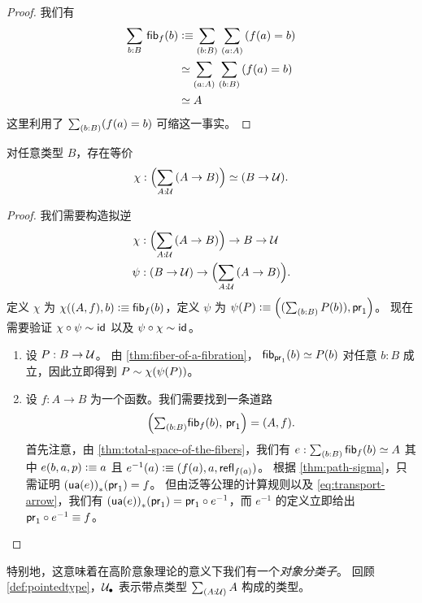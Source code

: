 \begin{proof}
  我们有
  \begin{align*}
    \sm{b:B}\hfib{f}{b} &\defeq \sm{b:B}{a:A} (f(a)=b)\\
    &\eqvsym \sm{a:A}{b:B} (f(a)=b)\\
    &\eqvsym A
  \end{align*}
  这里利用了 $\sm{b:B} (f(a)=b)$ 可缩这一事实。
\end{proof}

\begin{thm}\label{thm:nobject-classifier-appetizer}
对任意类型 $B$，存在等价
\begin{equation*}
\chi:\Parens{\sm{A:\type} (A\to B)}\eqvsym (B\to\type).
\end{equation*}
\end{thm}

\begin{proof}
我们需要构造拟逆
\begin{align*}
\chi & : \Parens{\sm{A:\type} (A\to B)}\to B\to\type\\
\psi & : (B\to\type)\to\Parens{\sm{A:\type} (A\to B)}.
\end{align*}
定义 $\chi$ 为 $\chi((A,f),b)\vcentcolon\equiv{\mathsf{fib}}_{f}(b)$，定义 $\psi$ 为 $\psi(P)\defeq\Pairr{(\sm{b:B} P(b)),\proj1}$。
现在需要验证 $\chi\circ\psi\sim\mathsf{id}_{}{}$ 以及 $\psi\circ\chi \sim\mathsf{id}_{}{}$。
\begin{enumerate}
\item 设 $P:B\to\mathcal{U}$。
  由 \cref{thm:fiber-of-a-fibration}，
${\mathsf{fib}}_{\mathsf{pr}_{1}}(b)\simeq P(b)$ 对任意 $b:B$ 成立，因此立即得到 $P\sim\chi(\psi(P))$。
\item 设 $f:A\to B$ 为一个函数。我们需要找到一条道路
\begin{equation*}
\Pairr{\tsm{b:B} \hfiber{f}b,\,\proj1}=\pairr{A,f}.
\end{equation*}
首先注意，由 \cref{thm:total-space-of-the-fibers}，我们有
$e:\sm{b:B} \hfiber{f}b\eqvsym A$ 其中 $e(b,a,p)\vcentcolon\equiv a$ 且 $e^{-1}(a)
\vcentcolon\equiv(f(a),a,\mathsf{refl}_{f(a)})$。
根据 \cref{thm:path-sigma}，只需证明 ${(\mathsf{ua}(e))}_{*}\mathopen{}\left({\mathsf{pr}_{1}}\right)\mathclose{} = f$。
但由泛等公理的计算规则以及 \eqref{eq:transport-arrow}，我们有 ${(\mathsf{ua}(e))}_{*}\mathopen{}\left({\mathsf{pr}_{1}}\right)\mathclose{} = \mathsf{pr}_{1}\circ e^{-1}$，而 $e^{-1}$ 的定义立即给出 $\mathsf{pr}_{1} \circ e^{-1} \equiv f$。\qedhere
\end{enumerate}
\end{proof}

\noindent
{}%
%
%
特别地，这意味着在高阶意象理论的意义下我们有一个\emph{对象分类子}。
回顾 \cref{def:pointedtype}，$\mathcal{U}_\bullet$ 表示带点类型 $\sm{A:\type} A$ 构成的类型。

